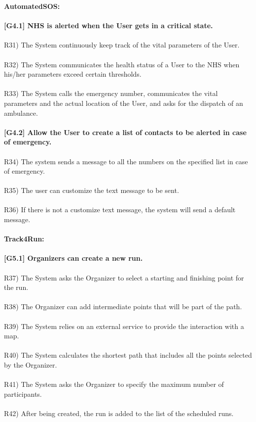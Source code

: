 \textbf{AutomatedSOS:} \\ \\ 
\textbf{[G4.1] NHS is alerted when the User gets in a critical state.} \\ \\
R31) The System continuously keep track of the vital parameters of the User. \\ \\
R32) The System communicates the health status of a User to the NHS when his/her parameters exceed certain thresholds. \\ \\
R33) The System calls the emergency number, communicates the vital parameters and the actual location of the User, and asks for the dispatch of an ambulance. \\ \\

\textbf{[G4.2] Allow the User to create a list of contacts to be alerted in case of emergency.} \\ \\
R34) The system sends a message to all the numbers on the specified list in case of emergency. \\ \\
R35) The user can customize the  text message to be sent. \\ \\
R36) If there is not a customize text message, the system will send a default message. \\ \\

\textbf{Track4Run:}\\ \\
\textbf{[G5.1] Organizers can create a new run.} \\ \\
R37) The System asks the Organizer to select a starting and finishing point for the run. \\ \\
R38) The Organizer can add intermediate points that will be part of the path. \\ \\
R39) The System relies on an external service to provide the interaction with a map. \\ \\
R40) The System calculates the shortest path that includes all the points selected by the Organizer. \\ \\   
R41) The System asks the Organizer to specify the maximum number of participants. \\ \\
R42) After being created, the run is added to the list of the scheduled runs. \\ \\

